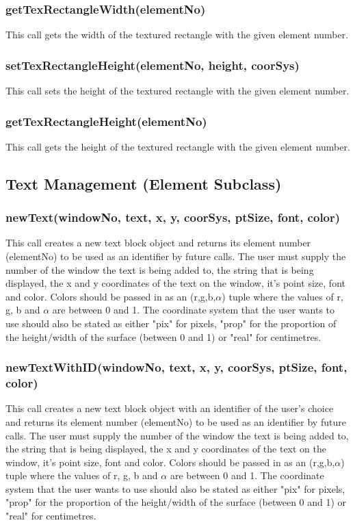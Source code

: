 \documentclass{acm_proc_article-sp}
\begin{document}
\subsubsection{getTexRectangleWidth(elementNo)}
This call gets the width of the textured rectangle with the given element number.
\subsubsection{setTexRectangleHeight(elementNo, height, coorSys)}
This call sets the height of the textured rectangle with the given element number.
\subsubsection{getTexRectangleHeight(elementNo)}
This call gets the height of the textured rectangle with the given element number.
\subsection{Text Management (Element Subclass)}
\subsubsection{newText(windowNo, text, x, y, coorSys, ptSize, font, color)}
This call creates a new text block object and returns its element number (elementNo) to be used as an identifier by future calls. The user must supply the number of the window the text is being added to, the string that is being displayed, the x and y coordinates of the text on the window, it's point size, font and color. Colors should be passed in as an (r,g,b,$\alpha$) tuple where the values of r, g, b and $\alpha$ are between 0 and 1. The coordinate system that the user wants to use should also be stated as either "pix" for pixels, "prop" for the proportion of the height/width of the surface (between 0 and 1) or "real" for centimetres.
\subsubsection{newTextWithID(windowNo, text, x, y, coorSys, ptSize, font, color)}
This call creates a new text block object with an identifier of the user's choice and returns its element number (elementNo) to be used as an identifier by future calls. The user must supply the number of the window the text is being added to, the string that is being displayed, the x and y coordinates of the text on the window, it's point size, font and color. Colors should be passed in as an (r,g,b,$\alpha$) tuple where the values of r, g, b and $\alpha$ are between 0 and 1. The coordinate system that the user wants to use should also be stated as either "pix" for pixels, "prop" for the proportion of the height/width of the surface (between 0 and 1) or "real" for centimetres.
\end{document}
